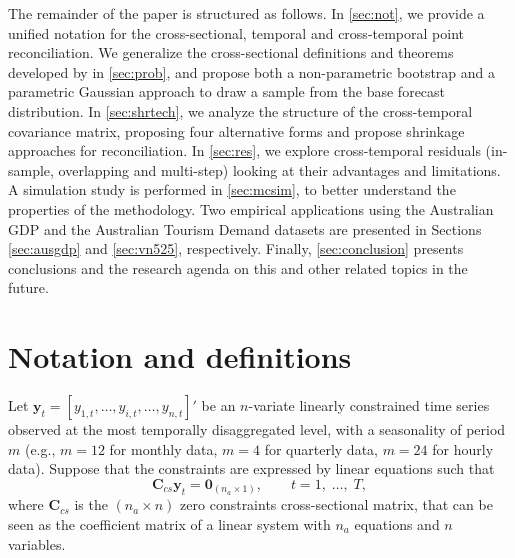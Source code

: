 \documentclass[a4paper,11pt]{article}
\newcommand{\yvet}{\bm{y}}
\newcommand{\Cvet}{\bm{C}}
\newcommand{\Zerovet}{\bm{0}}
\theoremstyle{definition}
\begin{document}
The remainder of the paper is structured as follows.
In \autoref{sec:not}, we provide a unified notation for the cross-sectional, temporal and cross-temporal point reconciliation.
We generalize the cross-sectional definitions and theorems developed by \cite{panagiotelis2023} in \autoref{sec:prob}, and propose both a non-parametric bootstrap and a parametric Gaussian approach to draw a sample from the base forecast distribution.
In \autoref{sec:shrtech}, we analyze the structure of the cross-temporal covariance matrix, proposing four alternative forms and propose shrinkage approaches for reconciliation.
In \autoref{sec:res}, we explore cross-temporal residuals (in-sample, overlapping and multi-step) looking at their advantages and limitations.
A simulation study is performed in \autoref{sec:mcsim}, to better understand the properties of the methodology.
Two empirical applications using the Australian GDP and the Australian Tourism Demand datasets are presented in Sections \ref{sec:ausgdp} and \ref{sec:vn525}, respectively.
Finally, \autoref{sec:conclusion} presents conclusions and the research agenda on this and other related topics in the future.

\section{Notation and definitions}\label{sec:not}


Let $\yvet_t = [y_{1,t},\dots,y_{i,t},\dots,y_{n,t}]'$ be an $n$-variate linearly constrained time series observed at the most temporally disaggregated level, with a seasonality of period $m$ (e.g., $m = 12$ for monthly data, $m = 4$ for quarterly data, $m = 24$ for hourly data). Suppose that the constraints are expressed by linear equations such that \citep{difonzo2023}
\begin{equation}
	\label{eq:cs_con}
	\Cvet_{cs}\yvet_t = \Zerovet_{(n_a \times 1)}, \qquad t = 1, \;\dots, \;T,
\end{equation}
where $\Cvet_{cs}$ is the $(n_a \times n)$ zero constraints cross-sectional matrix, that can be seen as the coefficient matrix of a linear system with $n_a$ equations and $n$ variables.


\end{document}
